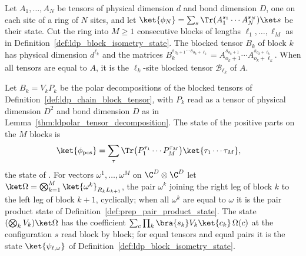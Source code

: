 \begin{definition}
    \label{def:ldp_chain_block_tensor}
    \leanok
    Let $A_1,\dots,A_N$ be tensors of physical dimension $d$ and bond dimension
    $D$, one on each site of a ring of $N$ sites, and let
    $\ket{\phi_N}=\sum_s\Tr(A_1^{s_1}\cdots A_N^{s_N})\ket s$ be their state.
    Cut the ring into $M\ge1$ consecutive blocks of lengths
    $\ell_1,\dots,\ell_M$ as in Definition~\ref{def:ldp_block_isometry_state}.
    The blocked tensor $B_k$ of block $k$ has physical dimension $d^{\ell_k}$ and
    the matrices
    $B_k^{s_{o_k+1}\cdots s_{o_k+\ell_k}}=A_{o_k+1}^{s_{o_k+1}}\cdots
        A_{o_k+\ell_k}^{s_{o_k+\ell_k}}$. When all tensors are equal to $A$, it is
    the $\ell_k$-site blocked tensor $\mathcal B_{\ell_k}$ of $A$.
\end{definition}

\begin{definition}
    \label{def:ldp_chain_pos_state}
    \leanok
    Let $B_k=V_kP_k$ be the polar decompositions of the blocked tensors of
    Definition~\ref{def:ldp_chain_block_tensor}, with $P_k$ read as a tensor of
    physical dimension $D^2$ and bond dimension $D$ as in
    Lemma~\ref{thm:ldpolar_tensor_decomposition}. The state of the positive
    parts on the $M$ blocks is
    \begin{align}
        \ket{\phi_{\mathrm{pos}}}
         & =\sum_{\tau}\Tr\bigl(P_1^{\tau_1}\cdots P_M^{\tau_M}\bigr)
        \ket{\tau_1\cdots\tau_M},
        \label{eq:ldp_chain_pos_state}
    \end{align}
    the state of \cite[eq.~(18)]{Malz2024Preparation}. For vectors
    $\omega^1,\dots,\omega^M$ on $\C^D\otimes\C^D$ let
    $\ket\Omega=\bigotimes_{k=1}^M\ket{\omega^k}_{R_kL_{k+1}}$, the pair
    $\omega^k$ joining the right leg of block $k$ to the left leg of block
    $k+1$, cyclically; when all $\omega^k$ are equal to $\omega$ it is the pair
    product state of Definition~\ref{def:prep_pair_product_state}. The state
    $(\bigotimes_kV_k)\ket\Omega$ has the coefficient
    $\sum_c\prod_k\bra{s_k}V_k\ket{c_k}\,\Omega(c)$ at the configuration $s$
    read block by block; for equal tensors and equal pairs it is the state
    $\ket{\psi_{\ell,\omega}}$ of Definition~\ref{def:ldp_block_isometry_state}.
\end{definition}


